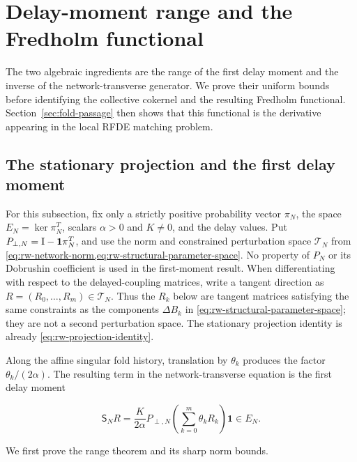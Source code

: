 \section{Delay-moment range and the Fredholm functional}
\label{sec:fredholm-sensitivity}

The two algebraic ingredients are the range of the first delay moment and
the inverse of the network-transverse generator.  We prove their uniform
bounds before identifying the collective cokernel and the resulting
Fredholm functional.  Section~\ref{sec:fold-passage} then shows that this
functional is the derivative appearing in the local RFDE matching problem.

\subsection{The stationary projection and the first delay moment}

For this subsection, fix only a strictly positive probability vector
\(\pi_N\), the space \(E_N=\ker\pi_N^T\), scalars \(\alpha>0\) and
\(K\ne0\), and the delay values.  Put
\(P_{\perp,N}=\mathrm I-\mathbf1\pi_N^T\), and use the norm and constrained
perturbation space \(\mathcal T_N\) from
\cref{eq:rw-network-norm,eq:rw-structural-parameter-space}.
No property of \(P_N\) or its Dobrushin
coefficient is used in the first-moment result.  When differentiating with
respect to the delayed-coupling matrices, write a tangent direction as
\(R=(R_0,\ldots,R_m)\in\mathcal T_N\).  Thus the \(R_k\) below
are tangent matrices satisfying the same constraints as the components
\(\Delta B_k\) in \cref{eq:rw-structural-parameter-space}; they are not a second
perturbation space.  The stationary projection identity is already
\cref{eq:rw-projection-identity}.

Along the affine singular fold history, translation by \(\theta_k\) produces
the factor \(\theta_k/(2\alpha)\).  The resulting term in the
network-transverse equation is the first delay moment

\begin{equation}
 \mathsf S_NR
 =\frac{K}{2\alpha}P_{\perp,N}
       \left(\sum_{k=0}^m\theta_kR_k\right)\mathbf 1
 \in E_N.
 \label{eq:fredholm-delay-moment}
\end{equation}

We first prove the range theorem and its sharp norm bounds.

